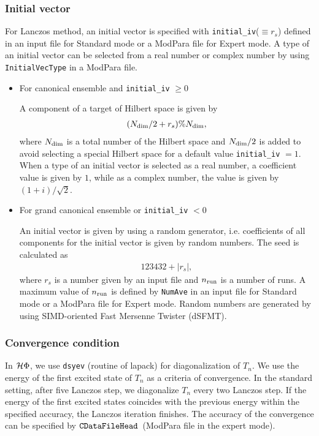 \subsubsection*{Initial vector}
For Lanczos method, an initial vector is specified with \verb|initial_iv|($\equiv r_s$) defined in an input file for Standard mode or a ModPara file for Expert mode. A type of an initial vector can be selected from a real number or complex number by using \verb|InitialVecType| in a ModPara file.
\begin{itemize}
\item{For canonical ensemble and \verb|initial_iv| $\geq 0$}

A component of a target of Hilbert space is given by
\begin{align}
(N_{\rm dim}/2 + r_s ) \% N_{\rm dim},
\end{align}
where $N_{\rm dim}$ is a total number of the Hilbert space and $N_{\rm dim}/2$ is added to avoid selecting a special Hilbert space for a default value \verb|initial_iv| $=1$.  When a type of an initial vector is selected as a real number, a coefficient value is given by $1$, while as a complex number, the value is given by $(1+i)/\sqrt{2}$.

\item{For grand canonical ensemble or \verb|initial_iv| $< 0$}

An initial vector is given by using a random generator, i.e. coefficients of all components for the initial vector is given by random numbers. The seed is calculated as 
\begin{align}
123432+|r_s|,
\end{align}
where $r_s$ is a number given by an input file and $n_{\rm run}$ is a number of runs. A maximum value of $n_{\rm run}$ is defined by \verb|NumAve| in an input file for Standard mode or a ModPara file for Expert mode. Random numbers are generated by using SIMD-oriented Fast Mersenne Twister (dSFMT)\cite{Mutsuo2008}. 
\end{itemize}

\subsubsection*{Convergence condition}
In $\mathcal{H} \Phi$,
we use \verb|dsyev| (routine of lapack)
for diagonalization of $T_{n}$.
We use the energy of the first excited state of $T_{n}$
as a criteria of convergence. 
In the standard setting,
after five Lanczos step,
we diagonalize $T_{n}$ every two Lanczos step.
If the energy of the first excited states coincides with
the previous energy within the specified accuracy,
the Lanczos iteration finishes.
The accuracy of the convergence can be specified by 
$\verb|CDataFileHead|$~(ModPara file in the expert mode).


